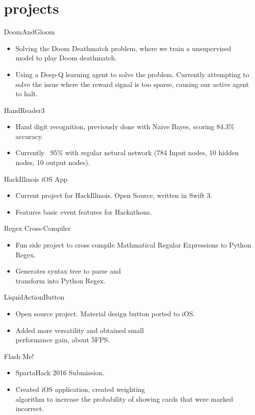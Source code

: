 \documentclass{tccv}
\begin{document}
\section{projects}

\begin{projectlist}
  {DoomAndGloom}
  \begin{itemize}
  \item Solving the Doom Deathmatch problem, where we train a unsupervised model to play Doom deathmatch.
  \item Using a Deep-Q learning agent to solve the problem. Currently attempting to solve the issue where the reward signal is too sparse, causing our active agent to halt.
  \end{itemize}

  {HandReader3}
  \begin{itemize}
  \item Hand digit recognition, previously done with Naive Bayes, scoring 84.3\% accuracy.
  \item Currently ~95\% with regular netural network (784 Input nodes, 10 hidden nodes, 10 output nodes).
  \end{itemize}

  {HackIllinois iOS App}

  \begin{itemize}
  \item Current project for HackIllinois. Open Source, written in Swift 3.
  \item Features basic event features for Hackathons.
  \end{itemize}

  {Regex Cross-Compiler}
  \begin{itemize}
  \item Fun side project to cross compile Mathmatical Regular Expressions to Python Regex.
  \item Generates syntax tree to parse and \\
    transform into Python Regex.

  \end{itemize}
  {LiquidActionButton}
  \begin{itemize}
  \item Open source project. Material design button ported to iOS.
  \item Added more versatility and obtained small \\
    performance gain, about 5FPS.
  \end{itemize}

  {Flash Me!}
  \begin{itemize}
  \item SpartaHack 2016 Submission.
  \item Created iOS application, created weighting \\
    algorithm to increase the probability of showing cards that were marked incorrect.
  \end{itemize}


\end{projectlist}
\end{document}
